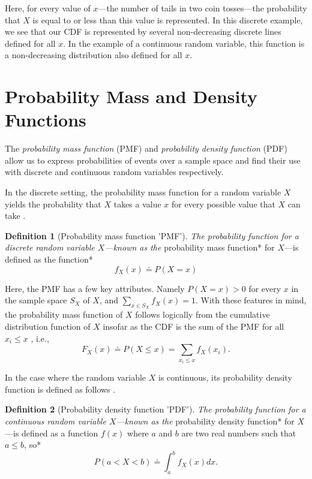 \documentclass[
  12pt,
  oneside]{book}
\theoremstyle{definition}
\newtheorem{definition}{Definition}[chapter]
\theoremstyle{definition}
\theoremstyle{definition}
\theoremstyle{remark}
\begin{document}
Here, for every value of \(x\)---the number of tails in two coin tosses---the probability that \(X\) is equal to or less than this value is represented.
In this discrete example, we see that our CDF is represented by several non-decreasing discrete lines defined for all \(x\).
In the example of a continuous random variable, this function is a non-decreasing distribution also defined for all \(x\).

\hypertarget{probability-mass-and-density-functions}{%
\section{Probability Mass and Density Functions}\label{probability-mass-and-density-functions}}

The \emph{probability mass function} (PMF) and \emph{probability density function} (PDF) allow us to express probabilities of events over a sample space and find their use with discrete and continuous random variables respectively.

In the discrete setting, the probability mass function for a random variable \(X\) yields the probability that \(X\) takes a value \(x\) for every possible value that \(X\) can take \citep[  2.2]{Wasserman2004}.

\begin{definition}[Probability mass function 'PMF']
\protect\hypertarget{def:pmf}{}{\label{def:pmf} {} }\emph{The probability function for a discrete random variable \(X\)---known as the }probability mass function* for \(X\)---is defined as the function*
\[f_{X}(x) \doteq P(X=x)\]
\end{definition}

Here, the PMF has a few key attributes.
Namely \(P(X=x)>0\) for every \(x\) in the sample space \(S_{X}\) of \(X\), and \(\sum_{x \in S_{X}}f_{X}(x)=1\).
With these features in mind, the probability mass function of \(X\) follows logically from the cumulative distribution function of \(X\) insofar as the CDF is the sum of the PMF for all \(x_{i}≤x\) \citep[  2.2]{Wasserman2004}, i.e., \[F_{X}(x) \doteq P(X≤x)=\sum_{x_i≤x}f_{X}(x_{i}).\]

In the case where the random variable \(X\) is continuous, its probability density function is defined as follows \citep[  2.2]{Wasserman2004}.

\begin{definition}[Probability density function 'PDF']
\protect\hypertarget{def:pdf}{}{\label{def:pdf} {} }\emph{The probability function for a continuous random variable \(X\)---known as the }probability density function* for \(X\)---is defined as a function \(f(x)\) where \(a\) and \(b\) are two real numbers such that \(a ≤ b\), so*
\[P(a<X<b) \doteq \int_{a}^{b}f_X(x)dx.\]
\end{definition}
\end{document}
